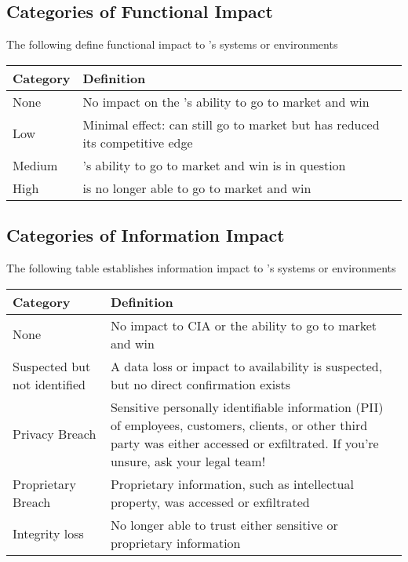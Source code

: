 \documentclass[../main.tex]{subfiles}
\begin{document}
\subsection{Categories of Functional Impact}
The following define functional impact to \CompanyName{}'s systems or environments \newline
\hspace*{-2cm}
\begin{tabular}{|p{3cm} p{16cm}|}
    \hline
    \textbf{Category} & \textbf{Definition} \\
    \hline
    None & No impact on the \CompanyName{} 's ability to go to market and win \\
    \hline
    Low & Minimal effect: \CompanyName{}  can still go to market but has reduced its competitive edge \\
    \hline
    Medium & \CompanyName{} 's ability to go to market and win is in question \\
    \hline
    High & \CompanyName{}  is no longer able to go to market and win \\
    \hline
\end{tabular}
\hspace*{-2cm}
\subsection{Categories of Information Impact}
The following table establishes information impact to \CompanyName{}’s systems or environments\newline
\hspace*{-2cm}
\begin{tabular}{|p{3cm} p{16cm}|}
    \hline
    \textbf{Category} & \textbf{Definition} \\
    \hline
    None & No impact to CIA or the ability to go to market and win \\
    \hline
    Suspected but not identified & A data loss or impact to availability is suspected, but no direct confirmation exists \\
    \hline
    Privacy Breach & Sensitive personally identifiable information (PII) of employees, customers, clients, or other third party was either accessed or exfiltrated.
    If you're unsure, ask your legal team! \\
    \hline
    Proprietary Breach & Proprietary information, such as intellectual property, was accessed or exfiltrated \\
    \hline
    Integrity loss & No longer able to trust either sensitive or proprietary information \\
    \hline
\end{tabular}
\hspace*{-2cm}
\end{document}
